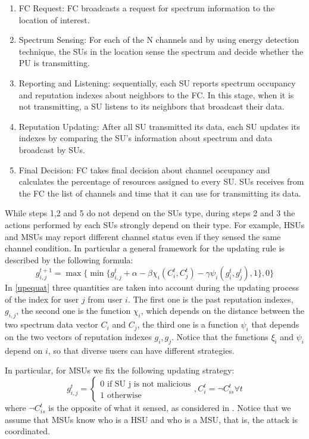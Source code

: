 \documentclass[letterpaper, 10 pt, conference]{ieeeconf}  %
\begin{document}
\begin{enumerate}
\item{FC Request: FC broadcasts a request for spectrum information to the location of interest.}
\item{Spectrum Sensing: For each of the N channels and by using energy detection technique, the SUs in the location sense the spectrum and decide whether the PU is transmitting.}
\item{Reporting and Listening: sequentially, each SU reports spectrum occupancy and reputation indexes about neighbors to the FC. In this stage, when it is not transmitting, a SU listens to its neighbors that broadcast their data.}
\item{Reputation Updating: After all SU transmitted its data, each SU updates its indexes by comparing the SU's information about spectrum and data broadcast by SUs.}
\item{Final Decision: FC takes final decision about channel occupancy and calculates the percentage of resources assigned to every SU. SUs receives from the FC the list of channels and time that it can use for transmitting its data.}
\end{enumerate}
While steps 1,2 and 5 do not depend on the SUs type, during steps 2 and 3 the actions performed by each SUs strongly depend on their type. For example, HSUs and MSUs may report different channel status even if they sensed the same channel condition. In particular a general framework for the updating rule is described by the following formula:
\begin{equation}
g^{t+1}_{i,j}=\max\{\min\{ g^t_{i,j}+\alpha-\beta \chi_i(C^t_i,C_j^t)-\gamma\psi_i(g^t_i,g^t_j),1\},0\}
\label{upequat}
\end{equation}
In \ref{upequat} three quantities are taken into account during the updating process of the index for user $j$ from user $i$. The first one is the past reputation indexes, $g_{i,j}$, the second one is the function $\chi_i$, which depends on the distance between the two spectrum data vector $C_i$ and $C_j$, the third one is a function $\psi_i$ that depends on the two vectors of reputation indexes $g_i,g_j$. Notice that the functions $\xi_i$ and $\psi_i$ depend on $i$, so that diverse users can have different strategies.

In particular, for MSUs we fix the following updating strategy:
\begin{equation}
g^t_{i,j}=
\begin{cases}
0\text{ if SU j is not malicious}\\
1\text{ otherwise}
\end{cases},
C^t_i=\neg C^t_{is} \forall t
\label{msustrat}
\end{equation}
where $\neg C^t_{is}$ is the opposite of what it sensed, as considered in \cite{leon}. Notice that we assume that MSUs know who is a HSU and who is a MSU, that is, the attack is coordinated.
\end{document}
